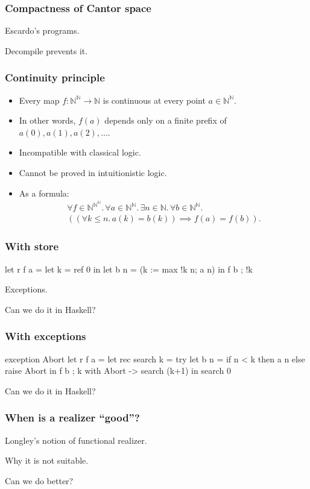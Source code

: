 \documentclass[t]{beamer}
\newcommand{\NN}{\mathbb{N}}
\begin{document}
\begin{frame}
  \frametitle{Compactness of Cantor space}

  Escardo's programs.

  Decompile prevents it.
\end{frame}

\begin{frame}
  \frametitle{Continuity principle}

  \begin{itemize}
  \item 
    Every map $f : \NN^\NN \to \NN$ is continuous at every point $a \in
    \NN^\NN$.
  \item 
    In other words, $f(a)$ depends only on a finite prefix of
    $a(0), a(1), a(2), \ldots$.
  \item Incompatible with classical logic.
  \item Cannot be proved in intuitionistic logic.
  \item As a formula:
    \begin{multline*}
      \forall f \in \NN^{\NN^\NN} .\,
      \forall a \in  \NN^\NN.\,
      \exists n \in \NN .\,
      \forall b \in \NN^\NN .\,\\
      ((\forall k \leq n .\, a(k) = b(k)) \implies f(a) = f(b)).
    \end{multline*}
  \end{itemize}

\end{frame}

\begin{frame}[fragile]
  \frametitle{With store}

\begin{source}
let r f a =
  let k = ref 0 in
  let b n = (k := max !k n; a n) in
    f b ; !k
\end{source}


  Exceptions.

  Can we do it in Haskell?
\end{frame}

\begin{frame}[fragile]
  \frametitle{With exceptions}

\begin{source}
exception Abort
let r f a =
  let rec search k =
    try
      let b n = 
        if n < k then a n else raise Abort
      in
        f b ; k
    with Abort -> search (k+1)
  in
    search 0
\end{source}

  Can we do it in Haskell?
\end{frame}

\begin{frame}
  \frametitle{When is a realizer ``good''?}

  Longley's notion of functional realizer.

  Why it is not suitable.

  Can we do better?
\end{frame}
\end{document}
